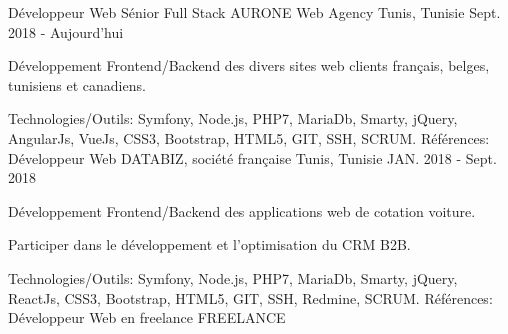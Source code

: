 \begin{cventries}
  \techentries
    {Développeur Web  Sénior Full Stack}
    {AURONE Web Agency}
    {Tunis, Tunisie}
    {Sept. 2018 - Aujourd'hui}
    {
      \begin{cvitems}
        \item {Développement Frontend/Backend des divers sites web clients français, belges, tunisiens et canadiens.}    
      \end{cvitems}
    }
    {\textcolor{awesome}{Technologies/Outils: } {\color{graytext}}  {Symfony, Node.js, PHP7, MariaDb, Smarty, jQuery, AngularJs, VueJs, CSS3, Bootstrap, HTML5, GIT, SSH, SCRUM.}}
    {Références:} 
    {
      \href{https://www.beaconsfield.ca/fr/}{} \break
      \href{http://www.advancia-training.com/}{} \break
      \href{https://www.talos.tn/}{} \break
    }
  \techentries
    {Développeur Web}
    {DATABIZ, société française}
    {Tunis, Tunisie}
    {JAN. 2018 - Sept. 2018}
    {
      \begin{cvitems}
		    \item {Développement Frontend/Backend des applications web de cotation voiture.}		
		    \item {Participer dans le développement et l'optimisation du CRM B2B.}
      \end{cvitems}
    }
    {\textcolor{awesome}{Technologies/Outils: } {\color{graytext}}  {Symfony, Node.js, PHP7, MariaDb, Smarty, jQuery, ReactJs, CSS3, Bootstrap, HTML5, GIT, SSH, Redmine, SCRUM.}}
    {Références:} 
    {\href{https://www.reprise-citroen.fr/}{} \break
     \href{https://www.reprise-cash-bypeugeot.fr/}{} \break
     \href{https://www.reprise.dsautomobiles.fr/}{}\break
     \href{https://ankaufservice.renault.de/}{}\break
    }
  \techentries
    {Développeur Web en freelance}
    {FREELANCE}

\end{cventries}
